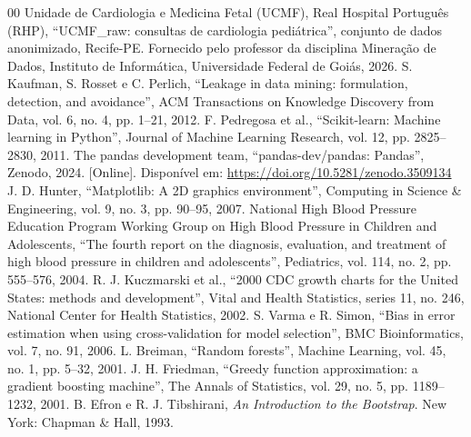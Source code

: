 \documentclass[conference]{IEEEtran}
\begin{document}
\begin{thebibliography}{00}
 Unidade de Cardiologia e Medicina Fetal (UCMF), Real Hospital Português (RHP), ``UCMF\_raw: consultas de cardiologia pediátrica'', conjunto de dados anonimizado, Recife-PE. Fornecido pelo professor da disciplina Mineração de Dados, Instituto de Informática, Universidade Federal de Goiás, 2026.
 S. Kaufman, S. Rosset e C. Perlich, ``Leakage in data mining: formulation, detection, and avoidance'', ACM Transactions on Knowledge Discovery from Data, vol. 6, no. 4, pp. 1--21, 2012.
 F. Pedregosa et al., ``Scikit-learn: Machine learning in Python'', Journal of Machine Learning Research, vol. 12, pp. 2825--2830, 2011.
 The pandas development team, ``pandas-dev/pandas: Pandas'', Zenodo, 2024. [Online]. Disponível em: \url{https://doi.org/10.5281/zenodo.3509134}
 J. D. Hunter, ``Matplotlib: A 2D graphics environment'', Computing in Science \& Engineering, vol. 9, no. 3, pp. 90--95, 2007.
 National High Blood Pressure Education Program Working Group on High Blood Pressure in Children and Adolescents, ``The fourth report on the diagnosis, evaluation, and treatment of high blood pressure in children and adolescents'', Pediatrics, vol. 114, no. 2, pp. 555--576, 2004.
 R. J. Kuczmarski et al., ``2000 CDC growth charts for the United States: methods and development'', Vital and Health Statistics, series 11, no. 246, National Center for Health Statistics, 2002.
 S. Varma e R. Simon, ``Bias in error estimation when using cross-validation for model selection'', BMC Bioinformatics, vol. 7, no. 91, 2006.
 L. Breiman, ``Random forests'', Machine Learning, vol. 45, no. 1, pp. 5--32, 2001.
 J. H. Friedman, ``Greedy function approximation: a gradient boosting machine'', The Annals of Statistics, vol. 29, no. 5, pp. 1189--1232, 2001.
 B. Efron e R. J. Tibshirani, \textit{An Introduction to the Bootstrap}. New York: Chapman \& Hall, 1993.
\end{thebibliography}
\end{document}
